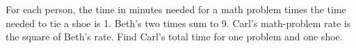 For each person, the time in minutes needed for a math problem times the time needed to tie a shoe is 1. Beth's two times sum to 9. Carl's math-problem rate is the square of Beth's rate. Find Carl's total time for one problem and one shoe.
